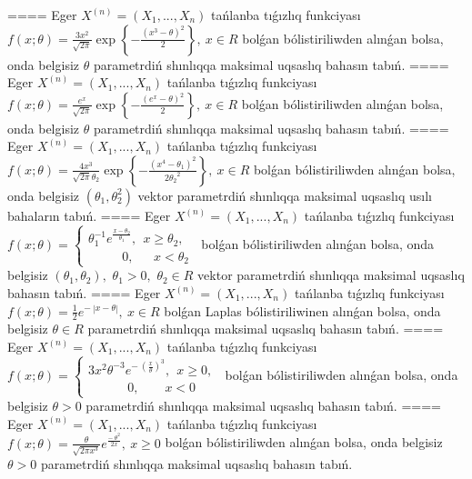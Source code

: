 ====
Eger \(X^{(n)} = \left( X_{1},...,X_{n} \right)\) tańlanba tıǵızlıq funkciyası
$f(x;\theta) = \frac{3x^{2}}{\sqrt{2\pi}}\exp\left\{ - \frac{\left( x^{3} - \theta \right)^{2}}{2} \right\},\ x \in R$
bolǵan bólistiriliwden alınǵan bolsa, onda belgisiz \(\theta\) parametrdiń shınlıqqa maksimal uqsaslıq bahasın tabıń.
====
Eger \(X^{(n)} = \left( X_{1},...,X_{n} \right)\) tańlanba tıǵızlıq funkciyası
$f(x;\theta) = \frac{e^{x}}{\sqrt{2\pi}}\exp\left\{ - \frac{\left( e^{x} - \theta \right)^{2}}{2} \right\},\ x \in R$
bolǵan bólistiriliwden alınǵan bolsa, onda belgisiz \(\theta\) parametrdiń shınlıqqa maksimal uqsaslıq bahasın tabıń.
====
Eger \(X^{(n)} = \left( X_{1},...,X_{n} \right)\) tańlanba tıǵızlıq funkciyası
$f(x;\theta) = \frac{4x^{3}}{\sqrt{2\pi}\theta_{2}}\exp\left\{ - \frac{\left( x^{4} - \theta_{1} \right)^{2}}{2{\theta_{2}}^{2}} \right\},\ x \in R$
bolǵan bólistiriliwden alınǵan bolsa, onda belgisiz \(\left( \theta_{1},\theta_{2}^{2} \right)\) vektor parametrdiń shınlıqqa maksimal uqsaslıq usılı bahaların tabıń.
====
Eger \(X^{(n)} = \left( X_{1},...,X_{n} \right)\) tańlanba tıǵızlıq funkciyası
$f(x;\theta) = \left\{ \begin{matrix}
\theta_{1}^{- 1}e^{\frac{x - \theta_{2}}{\theta_{1}}},\ \ x \geq \theta_{2}, \\
\ \ \ \ \ \ \ \ \ \ \ \ 0,\ \ \ \ \ \ \ x < \theta_{2}
\end{matrix} \right.\ $
bolǵan bólistiriliwden alınǵan bolsa, onda belgisiz \(\left( \theta_{1},\theta_{2} \right),\) \(\theta_{1} > 0,\) \(\theta_{2} \in R\) vektor parametrdiń shınlıqqa maksimal uqsaslıq bahasın tabıń.
====
Eger \(X^{(n)} = \left( X_{1},...,X_{n} \right)\) tańlanba tıǵızlıq funkciyası
$f(x;\theta) = \frac{1}{2}e^{- \ |x - \theta|},\ x \in R$
bolǵan Laplas bólistiriliwinen alınǵan bolsa, onda belgisiz \(\theta \in R\) parametrdiń shınlıqqa maksimal uqsaslıq bahasın tabıń.
====
Eger \(X^{(n)} = \left( X_{1},...,X_{n} \right)\) tańlanba tıǵızlıq funkciyası
$f(x;\theta) = \left\{ \begin{matrix}
3x^{2}\theta^{- 3}e^{- \ \left( \frac{x}{\theta} \right)^{3}},\ \ x \geq 0, \\
\ \ \ \ \ \ \ \ \ \ \ \ \ \ 0,\ \ \ \ \ \ \ \ \ x < 0
\end{matrix} \right.\ $
bolǵan bólistiriliwden alınǵan bolsa, onda belgisiz \(\theta > 0\) parametrdiń shınlıqqa maksimal uqsaslıq bahasın tabıń.
====
Eger \(X^{(n)} = \left( X_{1},...,X_{n} \right)\) tańlanba tıǵızlıq funkciyası
$f(x;\theta) = \frac{\theta}{\sqrt{2\pi x^{3}}}e^{\frac{- \ \theta^{2}}{2x}},\ x \geq 0$
bolǵan bólistiriliwden alınǵan bolsa, onda belgisiz \(\theta > 0\) parametrdiń shınlıqqa maksimal uqsaslıq bahasın tabıń.
